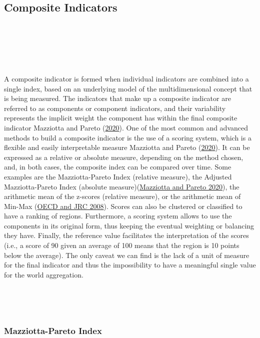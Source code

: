 \documentclass[
]{article}
\begin{document}
\hypertarget{composite-indicators}{%
\subsection{Composite Indicators}\label{composite-indicators}}

~

~

~

A composite indicator is formed when individual indicators are combined
into a single index, based on an underlying model of the
multidimensional concept that is being measured. The indicators that
make up a composite indicator are referred to as components or component
indicators, and their variability represents the implicit weight the
component has within the final composite indicator Mazziotta and Pareto (\protect\hyperlink{ref-mazziotta2020}{2020}). One of the most common and advanced methods to build a
composite indicator is the use of a scoring system, which is a flexible
and easily interpretable measure Mazziotta and Pareto (\protect\hyperlink{ref-mazziotta2020}{2020}).
It can be expressed as a relative or absolute measure, depending on the
method chosen, and, in both cases, the composite index can be compared
over time. Some examples are the Mazziotta-Pareto Index (relative
measure), the Adjusted Mazziotta-Pareto Index (absolute
measure)(\protect\hyperlink{ref-mazziotta2020}{Mazziotta and Pareto 2020}), the arithmetic mean of the z-scores (relative
measure), or the arithmetic mean of Min-Max (\protect\hyperlink{ref-joint2008handbook}{OECD and JRC 2008}). Scores
can also be clustered or classified to have a ranking of regions.
Furthermore, a scoring system allows to use the components in its
original form, thus keeping the eventual weighting or balancing they
have. Finally, the reference value facilitates the interpretation of the
scores (i.e., a score of 90 given an average of 100 means that the
region is 10 points below the average). The only caveat we can find is
the lack of a unit of measure for the final indicator and thus the
impossibility to have a meaningful single value for the world
aggregation.

~

~

\hypertarget{mazziotta-pareto-index}{%
\subsubsection{Mazziotta-Pareto Index}\label{mazziotta-pareto-index}}
\end{document}
